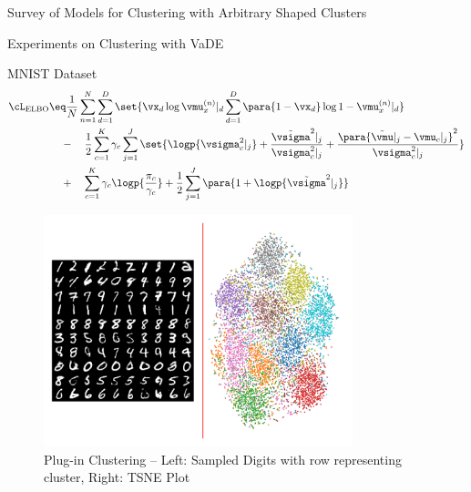 \documentclass{article}
\begin{document}
\begin{psection}{Survey of Models for Clustering with Arbitrary Shaped Clusters}
\begin{psubsection}{Experiments on Clustering with VaDE}
\begin{pssubsection}{MNIST Dataset}
			\begin{align*}
				\cL_\text{ELBO} &\eq \frac{1}{N} \sum_{n = 1}^N \sum_{d = 1}^D \set{\vx_d \log{\vmu_x^{(n)}|_d} \sum_{d = 1}^D \para{1 - \vx_d} \log{1 - {\vmu_x^{(n)}}|_d}} \\
				&\hspace{1.1em} -\quad \frac{1}{2} \sum_{c = 1}^K \gamma_c \sum_{j = 1}^J \set{\logp{\vsigma_c^2|_j} + \frac{{\tilde{\vsigma}^2}|_j}{\vsigma_c^2|_j} + \frac{\para{\tilde{\vmu}|_j - {\vmu_c}|_j}^2}{{\vsigma_c^2}|_j}} \\
				&\hspace{1.1em} +\quad \sum_{c = 1}^K \gamma_c \logp{\frac{\pi_c}{\gamma_c}} + \frac{1}{2} \sum_{j = 1}^J \para{1 + \logp{{\tilde{\vsigma}^2}|_j}}
			\end{align*}

			\begin{figure}[h!]
				\centering
				\includegraphics[width=0.8\textwidth, trim={0.5 0.8cm 0.5 0.8cm}, clip]{includes/plots/mnist/sample-initial.png}
				\caption{Plug-in Clustering -- Left: Sampled Digits with row representing cluster, Right: TSNE Plot}
				\label{fig:gmm-sample}
			\end{figure}


\end{pssubsection}
\end{psubsection}
\end{psection}
\end{document}
